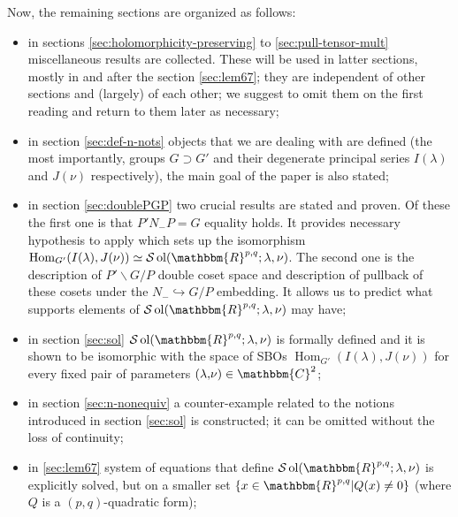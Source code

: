 \documentclass{article}
\newcommand{\comma}{{,}}
\newcommand{\tmop}[1]{\ensuremath{\operatorname{#1}}}
\newenvironment{itemizedot}{\begin{itemize} \renewcommand{\labelitemi}{$\bullet$}\renewcommand{\labelitemii}{$\bullet$}\renewcommand{\labelitemiii}{$\bullet$}\renewcommand{\labelitemiv}{$\bullet$}}{\end{itemize}}
\numberwithin{definition}{section}
\numberwithin{lemma}{section}
\numberwithin{proposition}{section}
{\theorembodyfont{\rmfamily}\newtheorem{remark}{Remark}
\numberwithin{remark}{section}
}
\begin{document}
Now, the remaining sections are organized as follows:
\begin{itemizedot}
  \item in sections \ref{sec:holomorphicity-preserving} to
  \ref{sec:pull-tensor-mult} miscellaneous results are collected. These will
  be used in latter sections, mostly in and after the section \ref{sec:lem67};
  they are independent of other sections and (largely) of each other; we
  suggest to omit them on the first reading and return to them later as
  necessary;
  
  \item in section \ref{sec:def-n-nots} objects that we are dealing with are
  defined (the most importantly, groups $G \supset G'$ and their degenerate
  principal series $I ( \lambda)$ and $J ( \nu)$ respectively), the main goal
  of the paper is also stated;
  
  \item in section \ref{sec:doublePGP} two crucial results are stated and
  proven. Of these the first one is that $P' N_- P = G$ equality holds. It
  provides necessary hypothesis to apply {\cite[thm
  3.16]{kobayashi2015symmetry}} which sets up the isomorphism \
  $\tmop{Hom}_{G'} ( I ( \lambda), J ( \nu)) \simeq \mathcal{S} \tmop{ol} (
  \mathbbm{R}^{p, q} ; \lambda, \nu)$. The second one is the description of
  $P' \backslash G / P$ double coset space and description of pullback of
  these cosets under the $N_- \hookrightarrow G / P$ embedding. It allows us
  to predict what supports elements of $\mathcal{S} \tmop{ol} (
  \mathbbm{R}^{p, q} ; \lambda, \nu)$ may have;
  
  \item in section \ref{sec:sol} $\mathcal{S} \tmop{ol} ( \mathbbm{R}^{p, q} ;
  \lambda, \nu)$ is formally defined and it is shown to be isomorphic with the
  space of SBOs $\tmop{Hom}_{G'} ( I ( \lambda), J ( \nu))$ for every fixed
  pair of parameters $( \lambda \comma \nu) \in \mathbbm{C}^2$;
  
  \item in section \ref{sec:n-nonequiv} a counter-example related to the
  notions introduced in section \ref{sec:sol} is constructed; it can be
  omitted without the loss of continuity;
  
  \item in \ref{sec:lem67} system of equations that define $\mathcal{S}
  \tmop{ol} ( \mathbbm{R}^{p, q} ; \lambda, \nu)$ is explicitly solved, but on
  a smaller set $\{ x \in \mathbbm{R}^{p, q} | Q ( x) \neq 0 \}$ (where $Q$ is
  a $( p, q)$-quadratic form);
  

\end{itemizedot}
\end{document}
